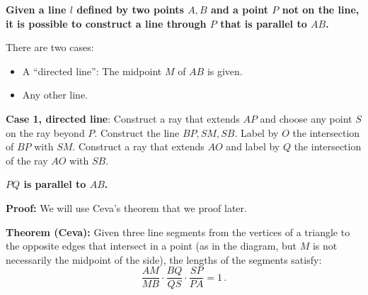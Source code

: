 \textbf{Given a line $l$ defined by two points $A,B$ and a point $P$ not on the line, it is possible to construct a line through $P$ that is parallel to $AB$.}

There are two cases:
\begin{itemize}
\setlength{\itemsep}{0pt}
\item A ``directed line'': The midpoint $M$ of $AB$ is given.
\item Any other line.
\end{itemize}

\textbf{Case 1, directed line}: Construct a ray that extends $AP$ and choose any point $S$ on the ray beyond $P$. Construct the line $BP,SM,SB$. Label by $O$ the intersection of $BP$ with $SM$. Construct a ray that extends $AO$ and label by $Q$ the intersection of the ray $AO$ with $SB$.

\begin{center}
\vspace*{-8pt}
\vspace*{-6pt}
\end{center}

\textbf{$PQ$ is parallel to $AB$.}

\textbf{Proof:} We will use Ceva's theorem that we proof later.

\textbf{Theorem (Ceva):} Given three line segments from the vertices of a triangle to the opposite edges that intersect in a point (as in the diagram, but $M$ is not necessarily the midpoint of the side), the lengths of the segments satisfy:
\[
\frac{AM}{MB}\cdot\frac{BQ}{QS}\cdot\frac{SP}{PA} = 1\,.
\]

